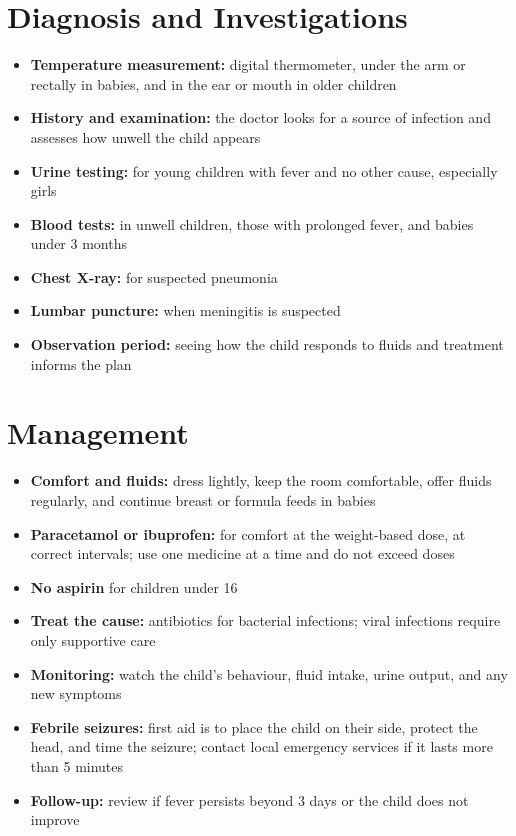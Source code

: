 \section*{Diagnosis and Investigations}
\begin{itemize}
    \item \textbf{Temperature measurement:} digital thermometer, under the arm or rectally in babies, and in the ear or mouth in older children
    \item \textbf{History and examination:} the doctor looks for a source of infection and assesses how unwell the child appears
    \item \textbf{Urine testing:} for young children with fever and no other cause, especially girls
    \item \textbf{Blood tests:} in unwell children, those with prolonged fever, and babies under 3 months
    \item \textbf{Chest X-ray:} for suspected pneumonia
    \item \textbf{Lumbar puncture:} when meningitis is suspected
    \item \textbf{Observation period:} seeing how the child responds to fluids and treatment informs the plan
\end{itemize}

\section*{Management}
\begin{itemize}
    \item \textbf{Comfort and fluids:} dress lightly, keep the room comfortable, offer fluids regularly, and continue breast or formula feeds in babies
    \item \textbf{Paracetamol or ibuprofen:} for comfort at the weight-based dose, at correct intervals; use one medicine at a time and do not exceed doses
    \item \textbf{No aspirin} for children under 16
    \item \textbf{Treat the cause:} antibiotics for bacterial infections; viral infections require only supportive care
    \item \textbf{Monitoring:} watch the child's behaviour, fluid intake, urine output, and any new symptoms
    \item \textbf{Febrile seizures:} first aid is to place the child on their side, protect the head, and time the seizure; contact local emergency services if it lasts more than 5 minutes
    \item \textbf{Follow-up:} review if fever persists beyond 3 days or the child does not improve
\end{itemize}

